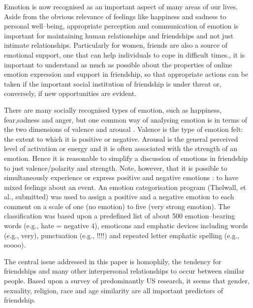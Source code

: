 \documentclass[twocolumn]{svjour3}          %
\begin{document}
Emotion is now recognised as an important aspect of many areas of our lives. Aside from the obvious relevance of feelings like happiness and sadness to personal well–being, appropriate perception and communication of emotion is important for maintaining human relationships and friendships and not just intimate relationships. Particularly for women, friends are also a source of emotional support, one that can help individuals to cope in difficult times.\cite{stoppard1993gender}, it is important to understand as much as possible about the properties of online emotion expression and support in friendship, so that appropriate actions can be taken if the important social institution of friendship is under threat or, conversely, if new opportunities are evident.

There are many socially recognised types of emotion, such as happiness, fear,sadness and anger, but one common way of analysing emotion is in terms of the two dimensions of valence and arousal \cite{cornelius1996science}. Valence is the type of emotion felt: the extent to which it is positive or negative. Arousal is the general perceived level of activation or energy and it is often associated
with the strength of an emotion. Hence it is reasonable to simplify a discussion of emotions in friendship to just valence/polarity and strength. Note, however, that it is possible to simultaneously experience or express positive and negative emotions \cite{fox2008emotion}: to have mixed feelings about an event.
An emotion categorisation program (Thelwall, et al., submitted) was used to assign a positive and a negative emotion to each comment on a scale of one (no emotion) to five (very strong emotion). The classification was based upon a predefined list of about 500 emotion–bearing words (e.g., hate = negative 4), emoticons and emphatic devices including words (e.g., very), punctuation (e.g., !!!!) and repeated letter emphatic spelling (e.g., soooo).\cite{thelwall2010emotion}

The central issue addressed in this paper is homophily, the tendency for friendships and many other interpersonal relationships to occur between similar people. Based upon a survey of predominantly US research, it seems that gender, sexuality, religion, race and age similarity are all important predictors of friendship\cite{mcpherson2001birds}.\cite{thelwall2009homophily}
\end{document}
